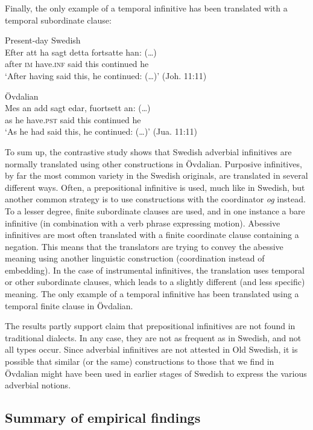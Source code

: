 \documentclass[output=paper]{langscibook}
\begin{document}
Finally, the only example of a temporal infinitive has been translated with a temporal subordinate clause: 


\ea
\label{ex:kalm:30}
\ea Present-day Swedish\label{ex:kalm:30a}\\ 
\gll Efter att ha sagt detta fortsatte han: (…)\\
 after \textsc{im} have.\textsc{inf} said this continued he\\
\glt ‘After having said this, he continued: (…)’ (Joh. 11:11)

\ex Övdalian\label{ex:kalm:30b}\\
\gll Mes an add sagt edar, fuortsett an: (…)\\
 as he have.\textsc{pst} said this continued he\\
\glt ‘As he had said this, he continued: (…)’ (Jua. 11:11)
\z
\z 


To sum up, the contrastive study shows that Swedish adverbial infinitives are normally translated using other constructions in Övdalian. Purposive infinitives, by far the most common variety in the Swedish originals, are translated in several different ways. Often, a prepositional infinitive is used, much like in Swedish, but another common strategy is to use constructions with the coordinator \textit{og} instead. To a lesser degree, finite subordinate clauses are used, and in one instance a bare infinitive (in combination with a verb phrase expressing motion). Abessive infinitives are most often translated with a finite coordinate clause containing a negation. This means that the translators are trying to convey the abessive meaning using another linguistic construction (coordination instead of embedding). In the case of instrumental infinitives, the translation uses temporal or other subordinate clauses, which leads to a slightly different (and less specific) meaning. The only example of a temporal infinitive has been translated using a temporal finite clause in Övdalian. 

The results partly support  claim that prepositional infinitives are not found in traditional dialects. In any case, they are not as frequent as in Swedish, and not all types occur. Since adverbial infinitives are not attested in Old Swedish, it is possible that similar (or the same) constructions to those that we find in Övdalian might have been used in earlier stages of Swedish to express the various adverbial notions. 


\subsection{Summary of empirical findings}\label{sec:kalm:4.4}
\end{document}

